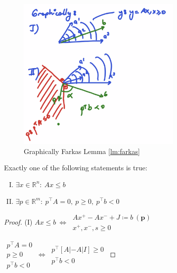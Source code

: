\documentclass[11pt]{article}
\numberwithin{equation}{section}
\begin{document}
    \begin{figure}[H]
        \centering
        \includegraphics[width=8cm]{images/5-pr-2.png}
        \caption{Graphically Farkas Lemma \ref{lm:farkas}}
    \end{figure}

    \begin{lemma}
        Exactly one of the following statements is true:
        \begin{enumerate}[I)]
            \item $\exists x \in \mathbb{R}^{n}: \ Ax\leq b$
            \item $\exists p \in \mathbb{R}^{m}: \ p^\top A=0, \ p \geq 0, \ p^\top b < 0$
        \end{enumerate}
        \begin{proof}
            (I) $Ax \leq b \ \Longleftrightarrow \  \begin{array}{l}
                A x^{+}-A x^{-}+J \coloneqq b \ (\mathbf{p})\\
                x^{+}, x^{-}, s \geq 0
                \end{array}$

                $\begin{array}{r}
                    p^{\top} A=0 \\
                    p \geq 0 \\
                    p^{\top} b<0
                    \end{array} \ \Longleftrightarrow \ \begin{array}{l}
                        p^{\top}[A|-A| I] \geqslant 0 \\
                        p^{\top}b<0
                        \end{array}$
        \end{proof}
    \end{lemma}
\end{document}
